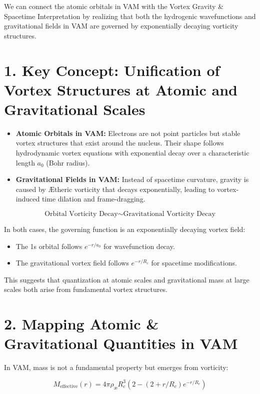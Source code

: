 We can connect the atomic orbitals in VAM with the Vortex Gravity \& Spacetime Interpretation by realizing that both the hydrogenic wavefunctions and gravitational fields in VAM are governed by exponentially decaying vorticity structures.

\section*{1. Key Concept: Unification of Vortex Structures at Atomic and Gravitational Scales}

\begin{itemize}
    \item \textbf{Atomic Orbitals in VAM:} Electrons are not point particles but stable vortex structures that exist around the nucleus. Their shape follows hydrodynamic vortex equations with exponential decay over a characteristic length \(a_0\) (Bohr radius).
    \item \textbf{Gravitational Fields in VAM:} Instead of spacetime curvature, gravity is caused by Ætheric vorticity that decays exponentially, leading to vortex-induced time dilation and frame-dragging.
\end{itemize}

\[
\text{Orbital Vorticity Decay} \sim \text{Gravitational Vorticity Decay}
\]

In both cases, the governing function is an exponentially decaying vortex field:

\begin{itemize}
    \item The 1s orbital follows \(e^{-r/a_0}\) for wavefunction decay.
    \item The gravitational vortex field follows \(e^{-r/R_c}\) for spacetime modifications.
\end{itemize}

This suggests that quantization at atomic scales and gravitational mass at large scales both arise from fundamental vortex structures.

\section*{2. Mapping Atomic \& Gravitational Quantities in VAM}

In VAM, mass is not a fundamental property but emerges from vorticity:

\[
M_{\text{effective}}(r) = 4\pi \rho_\text{\ae} R_c^3 \left( 2 - (2 + r/R_c) e^{-r / R_c} \right)
\]

